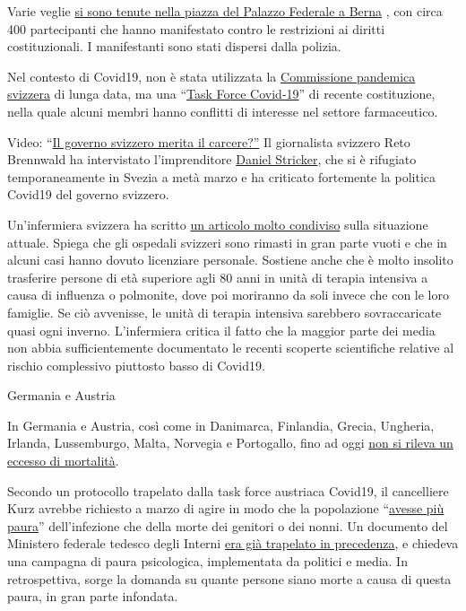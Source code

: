 Varie veglie
\href{https://www.zeitpunkt.ch/index.php/mahnwache-fuer-grundrechte-400-menschen-auf-dem-bundesplatz-wie-aus-dem-nichts}{si
sono tenute nella piazza del Palazzo Federale a Berna} , con circa 400
partecipanti che hanno manifestato contro le restrizioni ai diritti
costituzionali. I manifestanti sono stati dispersi dalla polizia.

Nel contesto di Covid19, non è stata utilizzata la
\href{https://www.srf.ch/news/schweiz/bag-verzichtete-auf-beratung-was-macht-die-pandemie-kommission-in-der-krise}{Commissione
pandemica svizzera} di lunga data, ma una
``\href{https://ncs-tf.ch/de/organisation}{Task Force Covid-19}'' di
recente costituzione, nella quale alcuni membri hanno conflitti di
interesse nel settore farmaceutico.

Video: ``\href{https://www.youtube.com/watch?v=RyZGkdeQ6CY}{Il governo
svizzero merita il carcere?''} Il giornalista svizzero Reto Brennwald ha
intervistato l'imprenditore
\href{https://www.youtube.com/user/timturpis/videos}{Daniel Stricker},
che si è rifugiato temporaneamente in Svezia a metà marzo e ha criticato
fortemente la politica Covid19 del governo svizzero.

Un'infermiera svizzera ha scritto
\href{https://www.facebook.com/simone.christinat/posts/10221314943115981}{un
articolo molto condiviso} sulla situazione attuale. Spiega che gli
ospedali svizzeri sono rimasti in gran parte vuoti e che in alcuni casi
hanno dovuto licenziare personale. Sostiene anche che è molto insolito
trasferire persone di età superiore agli 80 anni in unità di terapia
intensiva a causa di influenza o polmonite, dove poi moriranno da soli
invece che con le loro famiglie. Se ciò avvenisse, le unità di terapia
intensiva sarebbero sovraccaricate quasi ogni inverno. L'infermiera
critica il fatto che la maggior parte dei media non abbia
sufficientemente documentato le recenti scoperte scientifiche relative
al rischio complessivo piuttosto basso di Covid19.

Germania e Austria

In Germania e Austria, così come in Danimarca, Finlandia, Grecia,
Ungheria, Irlanda, Lussemburgo, Malta, Norvegia e Portogallo, fino ad
oggi \href{https://www.euromomo.eu/graphs-and-maps/}{non si rileva un
eccesso di mortalità}.

Secondo un protocollo trapelato dalla task force austriaca Covid19, il
cancelliere Kurz avrebbe richiesto a marzo di agire in modo che la
popolazione
``\href{https://www.derstandard.de/story/2000117131591/sitzungsprotokoll-der-taskforce-corona-ueber-zu-wenig-angst-in-der}{avesse
più paura}'' dell'infezione che della morte dei genitori o dei nonni. Un
documento del Ministero federale tedesco degli Interni
\href{https://fragdenstaat.de/dokumente/4123-wie-wir-covid-19-unter-kontrolle-bekommen/}{era
già trapelato in precedenza}, e chiedeva una campagna di paura
psicologica, implementata da politici e media. In retrospettiva, sorge
la domanda su quante persone siano morte a causa di questa paura, in
gran parte infondata.

